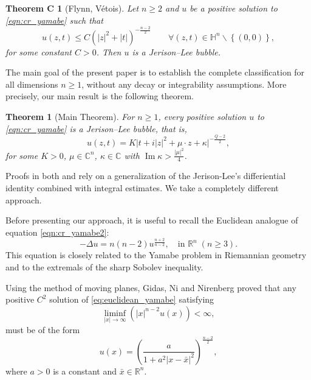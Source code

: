 \documentclass[reqno]{amsart}
\newtheorem{thm}{Theorem}[section]
\newtheorem*{thmc}{Theorem C}
\theoremstyle{definition}
\theoremstyle{remark}
\numberwithin{equation}{section}
\begin{document}
\begin{thmc}[Flynn, V\'etois] \label{thm:FV}
Let $n\ge2$ and $u$ be a positive solution to \eqref{eqn:cr_yamabe} such that
\begin{equation}\label{Th1Eq3}
u(z,t)\leq C \left(\left|z\right|^2+\left|t\right|\right)^{-\frac{n-2}{2}} 
\qquad \forall (z,t)\in\mathbb{H}^n\backslash\left\{(0,0)\right\},
\end{equation}
for some constant $C>0$. Then \(u\) is a Jerison–Lee bubble.
\end{thmc}

The main goal of the present paper is to establish the complete classification for all dimensions $n\geq 1$, 
without any decay or integrability assumptions. More precisely, our main result is the following theorem.

\begin{thm}[Main Theorem] \label{thm:main}
For $n \geq 1$, every positive solution $u$ to \eqref{eqn:cr_yamabe} is a Jerison–Lee bubble, that is,
\begin{equation*}
u(z,t) = K\bigl| t + i|z|^2 + \mu \cdot z + \kappa \bigr|^{-\frac{Q-2}{2}},
\end{equation*}
for some $K>0$, $\mu\in\mathbb{C}^n$, $\kappa\in\mathbb{C}$ with $\operatorname{Im}\kappa > \frac {|\mu|^2}{4}$.
\end{thm}

Proofs in both \cite{CLMR23} and \cite{FV23} rely on a generalization of the Jerison-Lee's differiential identity 
combined with integral estimates. We take a completely different approach.

Before presenting our approach, it is useful to recall the Euclidean analogue of equation \eqref{eqn:cr_yamabe2}:
\begin{equation}\label{eq:euclidean_yamabe}
-\Delta u = n(n-2)u^{\frac{n+2}{n-2}}, \quad \text{in } \mathbb{R}^n \; (n \ge 3).
\end{equation}
This equation is closely related to the Yamabe problem in Riemannian geometry and to the extremals of the sharp Sobolev inequality.

Using the method of moving planes, Gidas, Ni and Nirenberg \cite{GNN81} proved that any positive \(C^2\) solution of \eqref{eq:euclidean_yamabe} satisfying
\begin{equation}\label{eq:finite_condition}
\liminf_{|x| \to \infty} \left( |x|^{n-2} u(x) \right) < \infty,
\end{equation}
must be of the form
\[
u(x) = \left( \frac{a}{1 + a^2 |x - \bar{x}|^2} \right)^{\frac{n-2}{2}},
\]
where \(a > 0\) is a constant and \(\bar{x} \in \mathbb{R}^n\).
\end{document}

